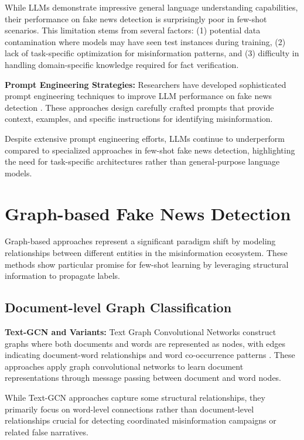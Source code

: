 While LLMs demonstrate impressive general language understanding capabilities, their performance on fake news detection is surprisingly poor in few-shot scenarios. This limitation stems from several factors: (1) potential data contamination where models may have seen test instances during training, (2) lack of task-specific optimization for misinformation patterns, and (3) difficulty in handling domain-specific knowledge required for fact verification.

\textbf{Prompt Engineering Strategies:} Researchers have developed sophisticated prompt engineering techniques to improve LLM performance on fake news detection \cite{wang2023survey}. These approaches design carefully crafted prompts that provide context, examples, and specific instructions for identifying misinformation.

Despite extensive prompt engineering efforts, LLMs continue to underperform compared to specialized approaches in few-shot fake news detection, highlighting the need for task-specific architectures rather than general-purpose language models.

\section{Graph-based Fake News Detection}

Graph-based approaches represent a significant paradigm shift by modeling relationships between different entities in the misinformation ecosystem. These methods show particular promise for few-shot learning by leveraging structural information to propagate labels.

\subsection{Document-level Graph Classification}

\textbf{Text-GCN and Variants:} Text Graph Convolutional Networks construct graphs where both documents and words are represented as nodes, with edges indicating document-word relationships and word co-occurrence patterns \cite{yao2019graph, liu2020early}. These approaches apply graph convolutional networks to learn document representations through message passing between document and word nodes.

While Text-GCN approaches capture some structural relationships, they primarily focus on word-level connections rather than document-level relationships crucial for detecting coordinated misinformation campaigns or related false narratives.

